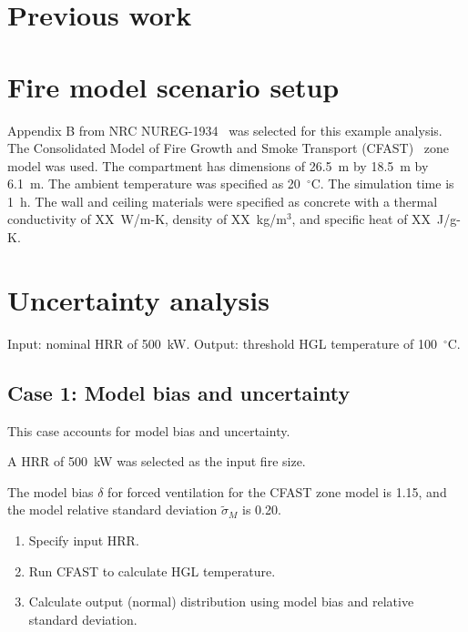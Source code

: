 \documentclass[12pt]{article}
\begin{document}
\section{Previous work}
\label{sec:previous_work}




\section{Fire model scenario setup}
\label{sec:fire_model_scenario_setup}

Appendix B from NRC NUREG-1934~\cite{NUREG_1934} was selected for this example analysis. The Consolidated Model of Fire Growth and Smoke Transport (CFAST)~\cite{CFAST_Users_Guide_6} zone model was used. The compartment has dimensions of 26.5~m by 18.5~m by 6.1~m. The ambient temperature was specified as 20~$^\circ$C. The simulation time is 1~h. The wall and ceiling materials were specified as concrete with a thermal conductivity of XX~W/m-K, density of XX~kg/m$^3$, and specific heat of XX~J/g-K.


\section{Uncertainty analysis}
\label{sec:uncertainty_analysis}

Input: nominal HRR of 500~kW.
Output: threshold HGL temperature of 100~$^\circ$C.


\clearpage


\subsection{Case 1: Model bias and uncertainty}

This case accounts for model bias and uncertainty.

A HRR of 500~kW was selected as the input fire size.

The model bias $\delta$ for forced ventilation for the CFAST zone model is 1.15, and the model relative standard deviation $\widetilde\sigma_M$ is 0.20.

\begin{enumerate}
\item Specify input HRR.
\item Run CFAST to calculate HGL temperature.
\item Calculate output (normal) distribution using model bias and relative standard deviation.
\end{enumerate}
\end{document}
